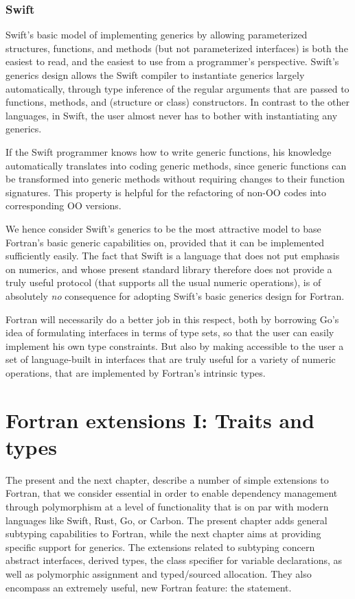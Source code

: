 \documentclass[11pt,oneside]{report}
\newcommand{\code}[1]{{\selectfont\ttfamily{#1}}}
\begin{document}
\subsection{Swift}

Swift's basic model of implementing generics by allowing parameterized
structures, functions, and methods (but not parameterized interfaces)
is both the easiest to read, and the easiest to use from a
programmer's perspective. Swift's generics design allows the Swift
compiler to instantiate generics largely automatically, through type
inference of the regular arguments that are passed to functions,
methods, and (structure or class) constructors. In contrast to the
other languages, in Swift, the user almost never has to bother with
instantiating any generics.

If the Swift programmer knows how to write generic functions, his
knowledge automatically translates into coding generic methods, since
generic functions can be transformed into generic methods without
requiring changes to their function signatures. This property is
helpful for the refactoring of non-OO codes into corresponding OO
versions.

We hence consider Swift's generics to be the most attractive model to
base Fortran's basic generic capabilities on, provided that it can be
implemented sufficiently easily. The fact that Swift is a language
that does not put emphasis on numerics, and whose present standard
library therefore does not provide a truly useful \code{Numeric}
protocol (that supports all the usual numeric operations), is of
absolutely \emph{no} consequence for adopting Swift's basic generics
design for Fortran.

Fortran will necessarily do a better job in this respect, both by
borrowing Go's idea of formulating interfaces in terms of type sets,
so that the user can easily implement his own type constraints. But
also by making accessible to the user a set of language-built in
interfaces that are truly useful for a variety of numeric operations,
that are implemented by Fortran's intrinsic types.


\chapter{Fortran extensions I: Traits and types}

The present and the next chapter, describe a number of simple
extensions to Fortran, that we consider essential in order to enable
dependency management through polymorphism at a level of functionality
that is on par with modern languages like Swift, Rust, Go, or
Carbon. The present chapter adds general subtyping capabilities to
Fortran, while the next chapter aims at providing specific support for
generics. The extensions related to subtyping concern abstract
interfaces, derived types, the class specifier for variable
declarations, as well as polymorphic assignment and typed/sourced
allocation. They also encompass an extremely useful, new Fortran
feature: the \code{implements} statement.
\end{document}
